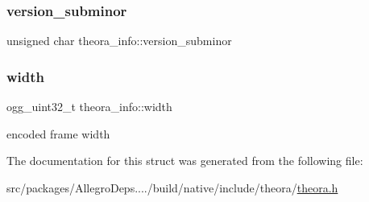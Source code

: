 \mbox{\label{structtheora__info_aa07967ecd6e20bd2928ead42b6397b3d}} 
\subsubsection{\texorpdfstring{version\+\_\+subminor}{version\_subminor}}
{\footnotesize\ttfamily unsigned char theora\+\_\+info\+::version\+\_\+subminor}

\mbox{\label{structtheora__info_a17c2fc651bb3329f1ea6b13ff1d3957b}} 
\subsubsection{\texorpdfstring{width}{width}}
{\footnotesize\ttfamily ogg\+\_\+uint32\+\_\+t theora\+\_\+info\+::width}

encoded frame width 

The documentation for this struct was generated from the following file\+:\begin{DoxyCompactItemize}
\item 
src/packages/\+Allegro\+Deps..../build/native/include/theora/\hyperlink{theora_8h}{theora.\+h}\end{DoxyCompactItemize}
